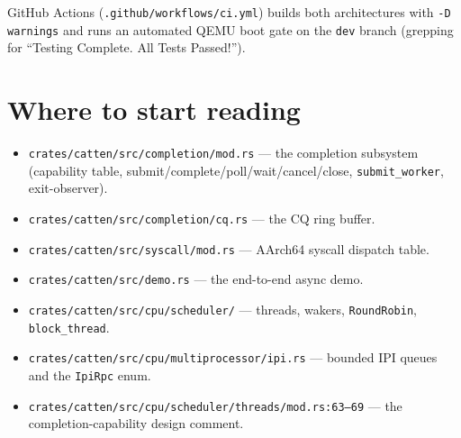 GitHub Actions (\texttt{.github/workflows/ci.yml}) builds both architectures
with \texttt{-D warnings} and runs an automated QEMU boot gate on the
\texttt{dev} branch (grepping for ``Testing Complete. All Tests Passed!'').

\section{Where to start reading}

\begin{itemize}
    \item \texttt{crates/catten/src/completion/mod.rs} --- the completion
        subsystem (capability table, submit/complete/poll/wait/cancel/close,
        \texttt{submit\_worker}, exit-observer).
    \item \texttt{crates/catten/src/completion/cq.rs} --- the CQ ring
        buffer.
    \item \texttt{crates/catten/src/syscall/mod.rs} --- AArch64 syscall
        dispatch table.
    \item \texttt{crates/catten/src/demo.rs} --- the end-to-end async demo.
    \item \texttt{crates/catten/src/cpu/scheduler/} --- threads, wakers,
        \texttt{RoundRobin}, \texttt{block\_thread}.
    \item \texttt{crates/catten/src/cpu/multiprocessor/ipi.rs} --- bounded
        IPI queues and the \texttt{IpiRpc} enum.
    \item \texttt{crates/catten/src/cpu/scheduler/threads/mod.rs:63--69} ---
        the completion-capability design comment.
\end{itemize}

\endinput
